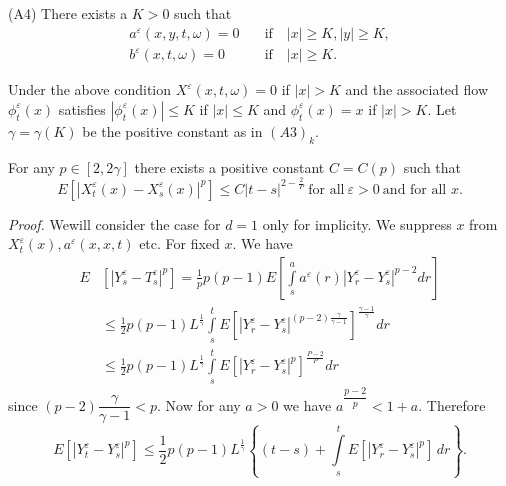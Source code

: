 \noindent
  (A4) There exists a $K > 0$ such that 
  \begin{align*}
    a^\varepsilon (x,y,t,\omega) = 0 & \quad \text{if} \quad  |x| \ge
    K, |y| \ge K,\\ 
    b^\varepsilon (x,t,\omega) = 0 & \quad \text{if} \quad  |x| \ge K.
  \end{align*}  
  
  Under the  above condition  $X^\varepsilon(x,t, \omega)= 0$ if
  $|x| > K$ and the associated flow $\phi^\varepsilon_t (x)$ satisfies
  $|\phi^\varepsilon_t (x) | \le K$ if $|x| \le K$ and
  $\phi^\varepsilon_t (x)=x$ if $|x| > K$. Let $\gamma = \gamma(K)$ be
  the positive constant as in $(A3)_k$.    


\begin{Lemma}\label{c3:lem3.4.1}%
  For any $p \in [2,2 \gamma]$ there exists a positive
  constant $C = C(p)$ such that  
  \begin{equation*}
    E[ |X^\varepsilon_t(x)- X^\varepsilon_s (x) |^p] \le C|t-s|^{2-
      \frac{2}{P}} ~\text{for all}~ \varepsilon > 0 ~\text{and for
      all } x. \tag{3.4.1}\label{c3:eq3.4.1} 
  \end{equation*}
\end{Lemma}  

\noindent \textit{Proof.}
  We\pageoriginale will consider the case for $d=1$ only for implicity. We suppress
  $x$ from $X^\varepsilon_t (x), a^\varepsilon (x,x,t)$ etc. For fixed
  $x$. We have  
  \begin{align*} 
  E&\left[|Y^\varepsilon_s- T^\varepsilon_s|^p\right] = \frac{1}{p}
  p(p-1) E \left[ \int\limits_{s}^a a^\varepsilon (r) |Y^\varepsilon_r-
    Y^\varepsilon_s|^{p-2} dr\right]\\ 
    &\le \frac{1}{2} p(p-1) L^{\frac{1}{\gamma}} \int\limits_{s}^t E \left[|
      Y^\varepsilon_r - Y^\varepsilon_s |^{(p-2)
        \frac{\gamma}{\gamma-1}}\right]^{\frac{\gamma-1}{\gamma}} dr \tag*{(by
      (A.3)(6))}\\ 
    &\le \frac{1}{2} p(p-1) L^{\frac{1}{\gamma}} \int\limits_{s}^t E \left[|
      Y^\varepsilon_r - Y^\varepsilon_s |^p\right]^{\frac{P-2}{P}} dr
    \tag{3.4.2}\label{c3:eq3.4.2}  
  \end{align*}
  since $(p-2) \dfrac{\gamma}{\gamma-1}<p$. Now for any $a>0$ we have
  $a^{\dfrac{p-2}{p}} < 1+a$. Therefore 
  \begin{equation*}
    E \left[|Y^\varepsilon_t - Y^\varepsilon_s|^p\right] \le
    \frac{1}{2} p(p-1)L^{\frac{1}{\gamma}} \left\{(t-s) +
    \int\limits_{s}^t E \left[|Y^\varepsilon_r- 
      Y^\varepsilon_s |^p\right] \, dr \right\}. \tag*{$\Box$} 
  \end{equation*}
  
